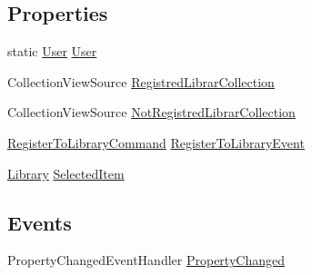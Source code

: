 \subsection*{Properties}
\begin{DoxyCompactItemize}
\item 
static \mbox{\hyperlink{class_easy_library_application_1_1_w_p_f_1_1_model_1_1_user}{User}} \mbox{\hyperlink{class_easy_library_application_1_1_w_p_f_1_1_view_model_1_1_register_to_library_view_model_a2bad0b1dd27d3c3d80617c938dd13417}{User}}
\item 
Collection\+View\+Source \mbox{\hyperlink{class_easy_library_application_1_1_w_p_f_1_1_view_model_1_1_register_to_library_view_model_acf7e0759dfdd955541a53e9e78e4e08b}{Registred\+Librar\+Collection}}
\item 
Collection\+View\+Source \mbox{\hyperlink{class_easy_library_application_1_1_w_p_f_1_1_view_model_1_1_register_to_library_view_model_ae3553520efa652cc7e510447151a3f8d}{Not\+Registred\+Librar\+Collection}}
\item 
\mbox{\hyperlink{class_easy_library_application_1_1_w_p_f_1_1_commands_1_1_register_to_library_command}{Register\+To\+Library\+Command}} \mbox{\hyperlink{class_easy_library_application_1_1_w_p_f_1_1_view_model_1_1_register_to_library_view_model_a42727cb60e815808028195dcef76f973}{Register\+To\+Library\+Event}}
\item 
\mbox{\hyperlink{class_easy_library_application_1_1_w_p_f_1_1_model_1_1_library}{Library}} \mbox{\hyperlink{class_easy_library_application_1_1_w_p_f_1_1_view_model_1_1_register_to_library_view_model_abd2f754baf953e907e0f72a4eb107181}{Selected\+Item}}
\end{DoxyCompactItemize}
\subsection*{Events}
\begin{DoxyCompactItemize}
\item 
Property\+Changed\+Event\+Handler \mbox{\hyperlink{class_easy_library_application_1_1_w_p_f_1_1_view_model_1_1_register_to_library_view_model_ac883e545476f345c2c3516a918826891}{Property\+Changed}}
\end{DoxyCompactItemize}


